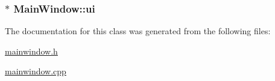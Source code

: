 \hypertarget{class_main_window_a35466a70ed47252a0191168126a352a5}{
\subsubsection[{ui}]{$\ast$ Main\-Window\-::ui\hspace{0.3cm}{\ttfamily [private]}}}\label{class_main_window_a35466a70ed47252a0191168126a352a5}


The documentation for this class was generated from the following files\-:\begin{DoxyCompactItemize}
\item 
\hyperlink{mainwindow_8h}{mainwindow.\-h}\item 
\hyperlink{mainwindow_8cpp}{mainwindow.\-cpp}\end{DoxyCompactItemize}
